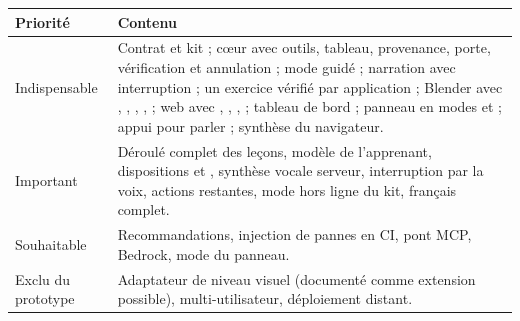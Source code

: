 \begin{xltabular}{\textwidth}{@{}L{2.4cm}Y@{}}
\toprule
\textbf{Priorité} & \textbf{Contenu} \\
\midrule
Indispensable & Contrat et kit ; cœur avec outils, tableau, provenance, porte, vérification et annulation ; mode guidé ; narration avec interruption ; un exercice vérifié par application ; Blender avec , , , ,  ; web avec , , ,  ; tableau de bord ; panneau en modes  et  ; appui pour parler ; synthèse du navigateur. \\
Important & Déroulé complet des leçons, modèle de l'apprenant, dispositions  et , synthèse vocale serveur, interruption par la voix, actions restantes, mode hors ligne du kit, français complet. \\
Souhaitable & Recommandations, injection de pannes en CI, pont MCP, Bedrock, mode  du panneau. \\
Exclu du prototype & Adaptateur de niveau visuel (documenté comme extension possible), multi-utilisateur, déploiement distant. \\
\bottomrule
\end{xltabular}

